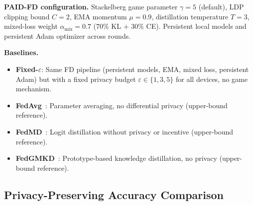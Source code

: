 \textbf{PAID-FD configuration.}
Stackelberg game parameter $\gamma = 5$ (default), LDP clipping bound $C = 2$,
EMA momentum $\mu = 0.9$, distillation temperature $T = 3$,
mixed-loss weight $\alpha_\text{mix} = 0.7$ ($70\%$ KL $+$ $30\%$ CE).
Persistent local models and persistent Adam optimizer across rounds.

\textbf{Baselines.}
\begin{itemize}
    \item \textbf{Fixed-$\varepsilon$}: Same FD pipeline (persistent models,
          EMA, mixed loss, persistent Adam) but with a fixed privacy budget
          $\varepsilon \in \{1, 3, 5\}$ for all devices, no game mechanism.
    \item \textbf{FedAvg}~\cite{mcmahan2017fedavg}: Parameter averaging,
          no differential privacy (upper-bound reference).
    \item \textbf{FedMD}~\cite{li2019fedmd}: Logit distillation without
          privacy or incentive (upper-bound reference).
    \item \textbf{FedGMKD}~\cite{wu2024fedgmkd}: Prototype-based knowledge
          distillation, no privacy (upper-bound reference).
\end{itemize}

\subsection{Privacy-Preserving Accuracy Comparison}\label{sec:accuracy}

